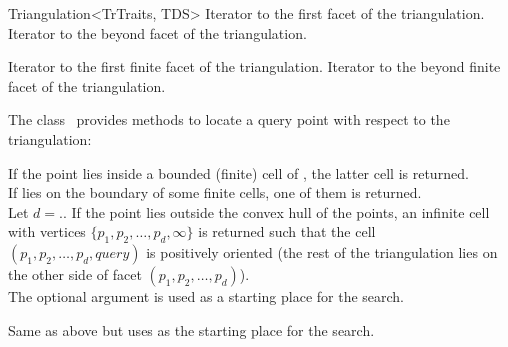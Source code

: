 \begin{ccRefClass}{Triangulation<TrTraits, TDS>}
{Iterator to the first facet of the triangulation.}
\ccGlue
{}
{Iterator to the beyond facet of the triangulation.}

{Iterator to the first finite facet of the triangulation.}
\ccGlue
{}
{Iterator to the beyond finite facet of the triangulation.}


The class \ccRefName\ provides methods to locate a query point with respect to
the triangulation:

{If the point  lies inside a bounded (finite) cell of \ccVar,
the latter cell is returned.\\
If  lies on the boundary of some finite cells, one of them
is returned.\\
Let $d=$\ccVar.. If the point  lies
outside the convex hull of the points, an infinite cell with vertices $\{
p_1, p_2, \ldots, p_d, \infty\}$ is returned such that the cell $(p_1, p_2,
\ldots, p_d, query)$ is positively oriented (the rest of the triangulation lies
on the other side of facet $(p_1, p_2, \ldots, p_d)$).\\
The optional argument  is used as a starting place for the search.}

{Same as above but uses  as the starting place for the search.}


\end{ccRefClass}
